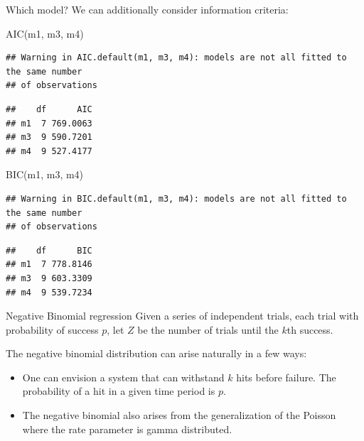 \documentclass[
  ignorenonframetext,
]{beamer}
\newenvironment{Shaded}{\begin{snugshade}}{\end{snugshade}}
\newcommand{\FunctionTok}[1]{\textcolor[rgb]{0.00,0.00,0.00}{#1}}
\newcommand{\NormalTok}[1]{#1}
\providecommand{\tightlist}{%
  \setlength{\itemsep}{0pt}\setlength{\parskip}{0pt}}
\begin{document}
\begin{frame}[fragile]{Which model?}
\protect\hypertarget{which-model}{}
We can additionally consider information criteria:

\vspace{12pt}
\tiny

\begin{Shaded}
\begin{Highlighting}[]
\FunctionTok{AIC}\NormalTok{(m1, m3, m4)}
\end{Highlighting}
\end{Shaded}

\begin{verbatim}
## Warning in AIC.default(m1, m3, m4): models are not all fitted to the same number
## of observations
\end{verbatim}

\begin{verbatim}
##    df      AIC
## m1  7 769.0063
## m3  9 590.7201
## m4  9 527.4177
\end{verbatim}

\begin{Shaded}
\begin{Highlighting}[]
\FunctionTok{BIC}\NormalTok{(m1, m3, m4)}
\end{Highlighting}
\end{Shaded}

\begin{verbatim}
## Warning in BIC.default(m1, m3, m4): models are not all fitted to the same number
## of observations
\end{verbatim}

\begin{verbatim}
##    df      BIC
## m1  7 778.8146
## m3  9 603.3309
## m4  9 539.7234
\end{verbatim}
\end{frame}

\begin{frame}{Negative Binomial regression}
\protect\hypertarget{negative-binomial-regression}{}
Given a series of independent trials, each trial with probability of
success \(p\), let \(Z\) be the number of trials until the \(k\)th
success.

\vspace{12pt}

The negative binomial distribution can arise naturally in a few ways:

\begin{itemize}
\tightlist
\item
  One can envision a system that can withstand \(k\) hits before
  failure. The probability of a hit in a given time period is \(p\).
\item
  The negative binomial also arises from the generalization of the
  Poisson where the rate parameter is gamma distributed.
\end{itemize}
\end{frame}
\end{document}
